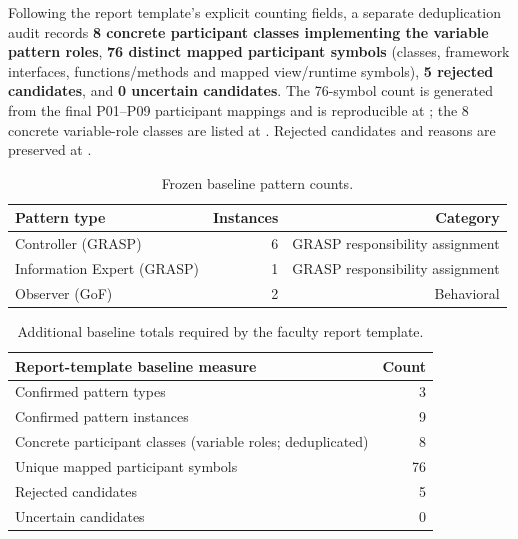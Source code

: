 \documentclass[11pt,a4paper]{article}
\renewcommand{\_}{\textunderscore\allowbreak}
\begin{document}
Following the report template's explicit counting fields, a separate deduplication audit records \textbf{8 concrete participant classes implementing the variable pattern roles}, \textbf{76 distinct mapped participant symbols} (classes, framework interfaces, functions/methods and mapped view/runtime symbols), \textbf{5 rejected candidates}, and \textbf{0 uncertain candidates}. The 76-symbol count is generated from the final P01--P09 participant mappings and is reproducible at ; the 8 concrete variable-role classes are listed at . Rejected candidates and reasons are preserved at .

\begin{table}[H]\centering
\begin{tabular}{lrr}\toprule
Pattern type & Instances & Category\\\midrule
Controller (GRASP) & 6 & GRASP responsibility assignment\\
Information Expert (GRASP) & 1 & GRASP responsibility assignment\\
Observer (GoF) & 2 & Behavioral\\\bottomrule
\end{tabular}
\caption{Frozen baseline pattern counts.}
\end{table}

\begin{table}[H]\centering
\begin{tabular}{lr}\toprule
Report-template baseline measure & Count\\\midrule
Confirmed pattern types & 3\\
Confirmed pattern instances & 9\\
Concrete participant classes (variable roles; deduplicated) & 8\\
Unique mapped participant symbols & 76\\
Rejected candidates & 5\\
Uncertain candidates & 0\\\bottomrule
\end{tabular}
\caption{Additional baseline totals required by the faculty report template.}
\end{table}
\end{document}
